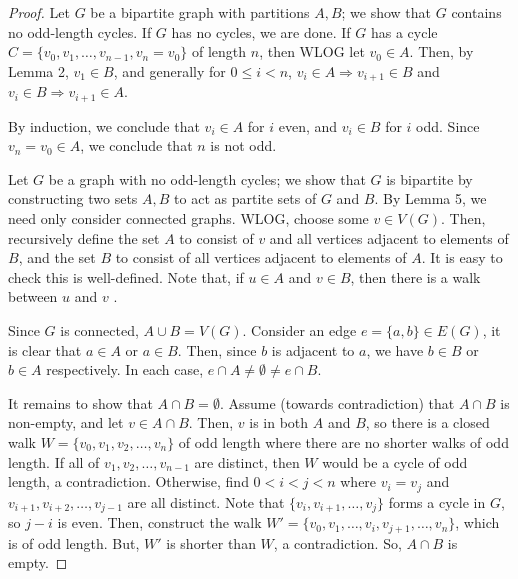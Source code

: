 \documentclass[a4paper,12pt]{article}
\begin{document}
\begin{proof}
Let $G$ be a bipartite graph with partitions $A, B$;
we show that $G$ contains no odd-length cycles.
If $G$ has no cycles, we are done. If $G$ has a cycle
$C = \{v_0, v_1, \dots, v_{n-1}, v_n=v_0\}$ of length $n$,
then WLOG let $v_0 \in A$. Then,
by Lemma 2, $v_1 \in B$, and generally for $0 \leq i < n$,
$v_{i} \in A \Rightarrow v_{i+1} \in B$ and
$v_{i} \in B \Rightarrow v_{i+1} \in A$.

By induction, we conclude that $v_i \in A$ for $i$ even, and $v_i \in B$ for
$i$ odd. Since $v_n = v_0 \in A$, we conclude that $n$ is not odd.

Let $G$ be a graph with no odd-length cycles; we show that $G$ is bipartite
by constructing two sets $A, B$ to act as partite sets of $G$ and $B$.
By Lemma 5, we need only consider connected graphs.
WLOG, choose some $v \in V(G)$. Then, recursively define
the set $A$ to consist of $v$ and all vertices adjacent to elements of $B$, and
the set $B$ to consist of all vertices adjacent to elements of $A$. It is easy
to check this is well-defined. Note that, if $u \in A$ and $v \in B$, then there
is a walk between $u$ and $v$ .

Since $G$ is connected, $A \cup B = V(G)$. Consider an edge
$e = \{a, b\} \in E(G)$, it is clear that $a \in A$ or $a \in B$. Then, since
$b$ is adjacent to $a$, we have $b \in B$ or $b \in A$ respectively.
In each case, $e \cap A \neq \emptyset \neq e \cap B$.

It remains to show that $A \cap B = \emptyset$.
Assume (towards contradiction) that $A \cap B$ is non-empty, and let
$v \in A \cap B$. Then, $v$ is in both $A$ and $B$, so there is a closed walk
$W = \{v_0, v_1, v_2, \dots, v_n\}$ of odd length
where there are no shorter walks of odd length. If all of $v_1, v_2,
\dots, v_{n-1}$ are distinct, then $W$ would be a cycle of odd length, a contradiction.
Otherwise, find $0 < i < j < n$ where $v_i = v_j$ and
$v_{i+1}, v_{i+2}, \dots, v_{j-1}$ are all distinct. Note that
$\{v_i, v_{i+1}, \dots, v_j\}$ forms a cycle in $G$, so $j-i$ is even.
Then, construct the walk $W' = \{v_0, v_1, \dots, v_i, v_{j+1}, \dots, v_n\}$,
which is of odd length. But, $W'$ is shorter than $W$, a contradiction.
So, $A \cap B$ is empty.


\end{proof}
\end{document}
